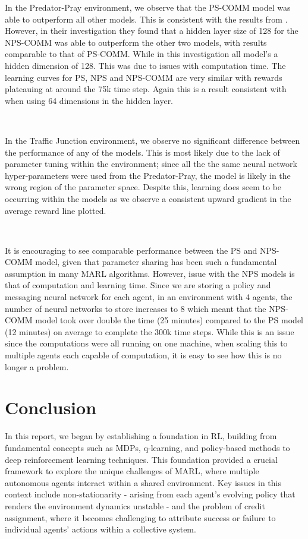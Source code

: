 \documentclass{article}
\begin{document}
In the Predator-Pray environment, we observe that the PS-COMM model was able to outperform all other models. This is consistent with the results from \citet{pina2024fully}. However, in their investigation they found that a hidden layer size of 128 for the NPS-COMM was able to outperform the other two models, with results comparable to that of PS-COMM. While in this investigation all model's a hidden dimension of 128. This was due to issues with computation time. The learning curves for PS, NPS and NPS-COMM are very similar with rewards plateauing at around the 75k time step. Again this is a result consistent with \citet{pina2024fully} when using 64 dimensions in the hidden layer. 

\

In the Traffic Junction environment, we observe no significant difference between the performance of any of the models. This is most likely due to the lack of parameter tuning within the environment; since all the the same neural network hyper-parameters were used from the Predator-Pray, the model is likely in the wrong region of the parameter space. Despite this, learning does seem to be occurring within the models as we observe a consistent upward gradient in the average reward line plotted.

\

It is encouraging to see comparable performance between the PS and NPS-COMM model, given that parameter sharing has been such a fundamental assumption in many MARL algorithms. However, issue with the NPS models is that of computation and learning time. Since we are storing a policy and messaging neural network for each agent, in an environment with 4 agents, the number of neural networks to store increases to 8 which meant that the NPS-COMM model took over double the time (25 minutes) compared to the PS model (12 minutes) on average to complete the 300k time steps. While this is an issue since the computations were all running on one machine, when scaling this to multiple agents each capable of computation, it is easy to see how this is no longer a problem.

\clearpage

\section{Conclusion}

In this report, we began by establishing a foundation in RL, building from fundamental concepts such as MDPs, q-learning, and policy-based methods to deep reinforcement learning techniques. This foundation provided a crucial framework to explore the unique challenges of MARL, where multiple autonomous agents interact within a shared environment. Key issues in this context include non-stationarity - arising from each agent's evolving policy that renders the environment dynamics unstable - and the problem of credit assignment, where it becomes challenging to attribute success or failure to individual agents' actions within a collective system.
\end{document}
